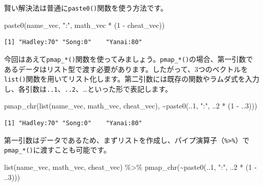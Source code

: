 \documentclass[
  a4paper,
  pandoc,
  ja=standard,
  jafont=haranoaji]{bxjsbook}
\newenvironment{Shaded}{\begin{snugshade}}{\end{snugshade}}
\newcommand{\DecValTok}[1]{\textcolor[rgb]{0.68,0.00,0.00}{#1}}
\newcommand{\FunctionTok}[1]{\textcolor[rgb]{0.28,0.35,0.67}{#1}}
\newcommand{\NormalTok}[1]{\textcolor[rgb]{0.00,0.48,0.65}{#1}}
\newcommand{\SpecialCharTok}[1]{\textcolor[rgb]{0.37,0.37,0.37}{#1}}
\newcommand{\StringTok}[1]{\textcolor[rgb]{0.13,0.47,0.30}{#1}}
\begin{document}
賢い解決法は普通に\texttt{paste0()}関数を使う方法です。

\begin{Shaded}
\begin{Highlighting}[numbers=left,,]
\FunctionTok{paste0}\NormalTok{(name\_vec, }\StringTok{":"}\NormalTok{, math\_vec }\SpecialCharTok{*}\NormalTok{ (}\DecValTok{1} \SpecialCharTok{{-}}\NormalTok{ cheat\_vec))}
\end{Highlighting}
\end{Shaded}

\begin{verbatim}
[1] "Hadley:70" "Song:0"    "Yanai:80" 
\end{verbatim}

今回はあえて\texttt{pmap\_*()}関数を使ってみましょう。\texttt{pmap\_*()}の場合、第一引数であるデータはリスト型で渡す必要があります。したがって、3つのベクトルを\texttt{list()}関数を用いてリスト化します。第二引数には既存の関数やラムダ式を入力し、各引数は\texttt{..1}、\texttt{..2}、\ldots といった形で表記します。

\begin{Shaded}
\begin{Highlighting}[numbers=left,,]
\FunctionTok{pmap\_chr}\NormalTok{(}\FunctionTok{list}\NormalTok{(name\_vec, math\_vec, cheat\_vec), }
         \SpecialCharTok{\textasciitilde{}}\FunctionTok{paste0}\NormalTok{(..}\DecValTok{1}\NormalTok{, }\StringTok{":"}\NormalTok{, ..}\DecValTok{2} \SpecialCharTok{*}\NormalTok{ (}\DecValTok{1} \SpecialCharTok{{-}}\NormalTok{ ..}\DecValTok{3}\NormalTok{)))}
\end{Highlighting}
\end{Shaded}

\begin{verbatim}
[1] "Hadley:70" "Song:0"    "Yanai:80" 
\end{verbatim}

第一引数はデータであるため、まずリストを作成し、パイプ演算子（\texttt{\%\textgreater{}\%}）で\texttt{pmap\_*()}に渡すことも可能です。

\begin{Shaded}
\begin{Highlighting}[numbers=left,,]
\FunctionTok{list}\NormalTok{(name\_vec, math\_vec, cheat\_vec) }\SpecialCharTok{\%\textgreater{}\%}
  \FunctionTok{pmap\_chr}\NormalTok{(}\SpecialCharTok{\textasciitilde{}}\FunctionTok{paste0}\NormalTok{(..}\DecValTok{1}\NormalTok{, }\StringTok{":"}\NormalTok{, ..}\DecValTok{2} \SpecialCharTok{*}\NormalTok{ (}\DecValTok{1} \SpecialCharTok{{-}}\NormalTok{ ..}\DecValTok{3}\NormalTok{)))}
\end{Highlighting}
\end{Shaded}
\end{document}
